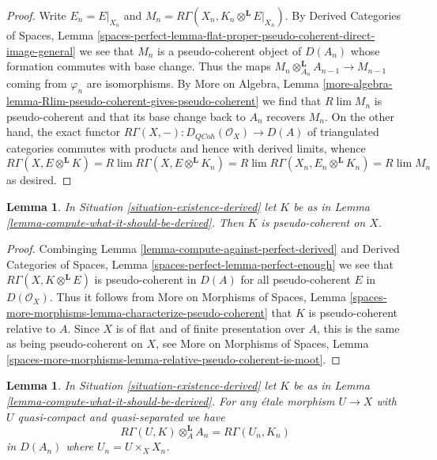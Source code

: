 \documentclass{stacks-project}
\theoremstyle{plain}
\newtheorem{lemma}[subsection]{Lemma}
\theoremstyle{definition}
\theoremstyle{remark}
\numberwithin{equation}{subsection}
\def\lim{\mathop{\mathrm{lim}}\nolimits}
\def\QCoh{\mathit{QCoh}}
\begin{document}
\begin{proof}
Write $E_n = E|_{X_n}$ and
$M_n = R\Gamma(X_n, K_n \otimes^\mathbf{L} E|_{X_n})$.
By Derived Categories of Spaces, Lemma
\ref{spaces-perfect-lemma-flat-proper-pseudo-coherent-direct-image-general}
we see that $M_n$ is a pseudo-coherent object of $D(A_n)$
whose formation commutes with base change. Thus the maps
$M_n \otimes_{A_n}^\mathbf{L} A_{n - 1} \to M_{n - 1}$
coming from $\varphi_n$ are isomorphisms. By
More on Algebra, Lemma
\ref{more-algebra-lemma-Rlim-pseudo-coherent-gives-pseudo-coherent}
we find that $R\lim M_n$ is pseudo-coherent and
that its base change back to $A_n$ recovers $M_n$.
On the other hand, the exact functor
$R\Gamma(X, -) : D_\QCoh(\mathcal{O}_X) \to D(A)$
of triangulated categories commutes with products
and hence with derived limits, whence
$$
R\Gamma(X, E \otimes^\mathbf{L} K) =
R\lim R\Gamma(X,  E \otimes^\mathbf{L} K_n) =
R\lim R\Gamma(X_n, E_n \otimes^\mathbf{L} K_n) =
R\lim M_n
$$
as desired.
\end{proof}

\begin{lemma}
\label{lemma-relative-pseudo-coherence-derived}
In Situation \ref{situation-existence-derived} let $K$ be as in
Lemma \ref{lemma-compute-what-it-should-be-derived}. Then $K$
is pseudo-coherent on $X$.
\end{lemma}

\begin{proof}
Combinging Lemma \ref{lemma-compute-against-perfect-derived} and
Derived Categories of Spaces, Lemma
\ref{spaces-perfect-lemma-perfect-enough}
we see that $R\Gamma(X, K \otimes^\mathbf{L} E)$
is pseudo-coherent in $D(A)$ for all pseudo-coherent
$E$ in $D(\mathcal{O}_X)$. Thus it follows from
More on Morphisms of Spaces, Lemma
\ref{spaces-more-morphisms-lemma-characterize-pseudo-coherent}
that $K$ is pseudo-coherent relative to $A$.
Since $X$ is of flat and of finite presentation
over $A$, this is the same as being pseudo-coherent on $X$, see
More on Morphisms of Spaces, Lemma
\ref{spaces-more-morphisms-lemma-relative-pseudo-coherent-is-moot}.
\end{proof}

\begin{lemma}
\label{lemma-compute-over-affine-derived}
In Situation \ref{situation-existence-derived} let $K$ be as in
Lemma \ref{lemma-compute-what-it-should-be-derived}. For any
\'etale morphism $U \to X$ with $U$ quasi-compact and quasi-separated we have
$$
R\Gamma(U, K) \otimes_A^\mathbf{L} A_n =
R\Gamma(U_n, K_n)
$$
in $D(A_n)$ where $U_n = U \times_X X_n$.
\end{lemma}
\end{document}
